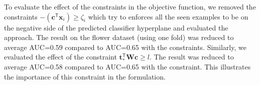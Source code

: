 \begin{table}[t]
\small
\caption{\small Linear: Top-5 classes with highest combined improvement in Flower dataset}
\label{T:top5improv}
\centering
{
}
\vspace{-2pt}
\end{table}







To evaluate the effect of the constraints in the objective function, we removed the constraints $- (\mathbf{c}^\textsf{T} {\mathbf{x}}_{i} ) \geq \zeta_i$ which try to enforces all the seen examples to be on the negative side of the predicted classifier hyperplane and evaluated the approach. The result on the flower dataset (using one fold) was reduced to average AUC=0.59 compared to AUC=0.65 with the constraints. Similarly, we evaluated the effect of the constraint  $\mathbf{t}_*^\textsf{T} \mathbf{W} \mathbf{c} \ge l$. The result was reduced to average AUC=0.58 compared to AUC=0.65 with the constraint.  This illustrates the importance of this constraint in the formulation.

